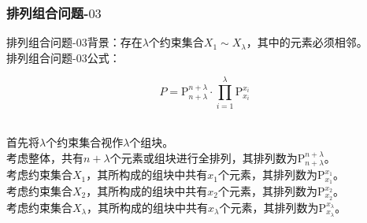 \documentclass[UTF8]{ctexart}
\newcommand{\rnum}[1]{\uppercase\expandafter{\romannumeral #1\relax}}
\begin{document}
\subsubsection{排列组合问题\rnum{1}-$03$}
    排列组合问题\rnum{1}-$03$背景：存在$\lambda$个约束集合$X_1\sim X_\lambda$，其中的元素必须相邻。\\[3mm]
    排列组合问题\rnum{1}-$03$公式：
    \begin{large}
        \begin{equation*}
            P=\mathrm{P}_{n+\lambda}^{n+\lambda}\cdot\prod_{i=1}^\lambda\mathrm{P}_{x_i}^{x_i}
        \end{equation*}
    \end{large}\\
    首先将$\lambda$个约束集合视作$\lambda$个组块。\\[3mm]
    考虑整体，共有$n+\lambda$个元素或组块进行全排列，其排列数为$\mathrm{P}_{n+\lambda}^{n+\lambda}$。\\[3mm]
    考虑约束集合$X_1$，其所构成的组块中共有$x_1$个元素，其排列数为$\mathrm{P}_{x_1}^{x_1}$。\\[3mm]
    考虑约束集合$X_2$，其所构成的组块中共有$x_2$个元素，其排列数为$\mathrm{P}_{x_2}^{x_2}$。\\[3mm]
    考虑约束集合$X_\lambda$，其所构成的组块中共有$x_\lambda$个元素，其排列数为$\mathrm{P}_{x_\lambda}^{x_\lambda}$。\vspace{8pt}

\newpage
\end{document}
